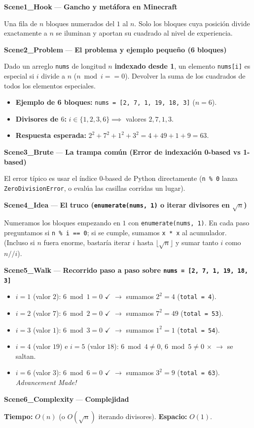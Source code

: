 \documentclass[letterpaper,10pt]{article}
\newcommand{\scene}[2]{\noindent\textbf{\textcolor{mcaqua}{#1}} --- \textbf{#2}\par\vspace{1pt}}
\begin{document}
\begin{shaded}
\scene{Scene1\_Hook}{Gancho y met\'afora en Minecraft}
Una fila de $n$ bloques numerados del $1$ al $n$. Solo los bloques cuya posici\'on divide exactamente a $n$ se iluminan y aportan su cuadrado al nivel de experiencia.

\scene{Scene2\_Problem}{El problema y ejemplo peque\~no (6 bloques)}
Dado un arreglo \texttt{nums} de longitud $n$ \textbf{indexado desde 1}, un elemento \texttt{nums[i]} es especial si $i$ divide a $n$ ($n \bmod i == 0$). Devolver la suma de los cuadrados de todos los elementos especiales.
\begin{itemize}\setlength{\itemsep}{1pt}
  \item \textbf{Ejemplo de 6 bloques:} \texttt{nums = [2, 7, 1, 19, 18, 3]} ($n = 6$).
  \item \textbf{Divisores de $6$:} $i \in \{1, 2, 3, 6\} \implies$ valores $2, 7, 1, 3$.
  \item \textbf{Respuesta esperada:} $2^2 + 7^2 + 1^2 + 3^2 = 4 + 49 + 1 + 9 = 63$.
\end{itemize}

\scene{Scene3\_Brute}{La trampa com\'un (Error de indexaci\'on 0-based vs 1-based)}
El error t\'ipico es usar el \'indice $0$-based de Python directamente (\texttt{n \% 0} lanza \texttt{ZeroDivisionError}, o eval\'ua las casillas corridas un lugar).

\scene{Scene4\_Idea}{El truco (\texttt{enumerate(nums, 1)} o iterar divisores en $\sqrt{n}$)}
Numeramos los bloques empezando en $1$ con \texttt{enumerate(nums, 1)}. En cada paso preguntamos si \texttt{n \% i == 0}; si se cumple, sumamos \texttt{x * x} al acumulador. (Incluso si $n$ fuera enorme, bastar\'ia iterar $i$ hasta $\lfloor\sqrt{n}\rfloor$ y sumar tanto $i$ como $n // i$).

\scene{Scene5\_Walk}{Recorrido paso a paso sobre \texttt{nums = [2, 7, 1, 19, 18, 3]}}
\begin{itemize}\setlength{\itemsep}{1pt}
  \item $i = 1$ (valor $2$): $6 \bmod 1 = 0$ $\checkmark$ $\to$ sumamos $2^2 = 4$ (\texttt{total = 4}).
  \item $i = 2$ (valor $7$): $6 \bmod 2 = 0$ $\checkmark$ $\to$ sumamos $7^2 = 49$ (\texttt{total = 53}).
  \item $i = 3$ (valor $1$): $6 \bmod 3 = 0$ $\checkmark$ $\to$ sumamos $1^2 = 1$ (\texttt{total = 54}).
  \item $i = 4$ (valor $19$) e $i = 5$ (valor $18$): $6 \bmod 4 \neq 0$, $6 \bmod 5 \neq 0$ $\times$ $\to$ se saltan.
  \item $i = 6$ (valor $3$): $6 \bmod 6 = 0$ $\checkmark$ $\to$ sumamos $3^2 = 9$ (\texttt{total = 63}). \textit{Advancement Made!}
\end{itemize}

\scene{Scene6\_Complexity}{Complejidad}
\textbf{Tiempo:} $O(n)$ (o $O(\sqrt{n})$ iterando divisores). \quad \textbf{Espacio:} $O(1)$.
\end{shaded}
\end{document}
